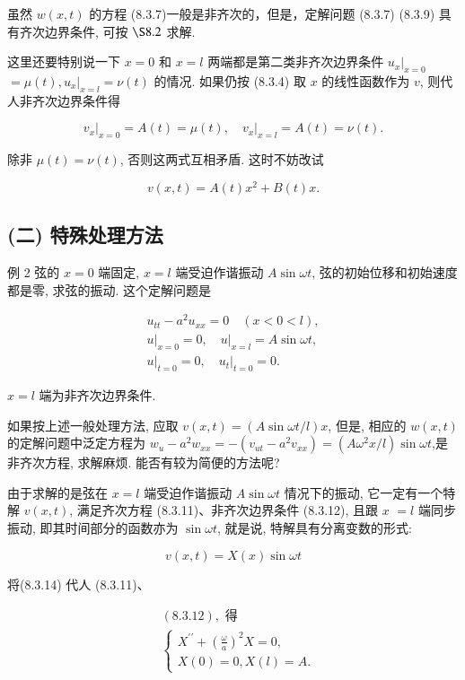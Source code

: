 虽然 $w(x, t)$ 的方程 (8.3.7)一般是非齐次的，但是，定解问题 (8.3.7) (8.3.9) 具有齐次边界条件, 可按 $\S 8.2$ 求解.

这里还要特别说一下 $x=0$ 和 $x=l$ 两端都是第二类非齐次边界条件 $\left.u_{x}\right|_{x=0}$ $=\mu(t),\left.u_{x}\right|_{x=l}=\nu(t)$ 的情况. 如果仍按 (8.3.4) 取 $x$ 的线性函数作为 $v$, 则代人非齐次边界条件得

$$
\left.v_{x}\right|_{x=0}=A(t)=\mu(t),\left.\quad v_{x}\right|_{x=l}=A(t)=\nu(t) .
$$

除非 $\mu(t)=\nu(t)$, 否则这两式互相矛盾. 这时不妨改试

$$
v(x, t)=A(t) x^{2}+B(t) x .
$$

\subsection{(二) 特殊处理方法}
例 2 弦的 $x=0$ 端固定, $x=l$ 端受迫作谐振动 $A \sin \omega t$, 弦的初始位移和初始速度都是零, 求弦的振动. 这个定解问题是

$$
\begin{gathered}
u_{t t}-a^{2} u_{x x}=0 \quad(x<0<l), \\
\left.u\right|_{x=0}=0,\left.\quad u\right|_{x=l}=A \sin \omega t, \\
\left.u\right|_{t=0}=0,\left.\quad u_{t}\right|_{t=0}=0 .
\end{gathered}
$$

$x=l$ 端为非齐次边界条件.

如果按上述一般处理方法, 应取 $v(x, t)=(A \sin \omega t / l) x$, 但是, 相应的 $w(x, t)$ 的定解问题中泛定方程为 $w_{u}-a^{2} w_{x x}=-\left(v_{u t}-a^{2} v_{x x}\right)=\left(A \omega^{2} x / l\right) \sin \omega t$,是非齐次方程, 求解麻烦. 能否有较为简便的方法呢?

由于求解的是弦在 $x=l$ 端受迫作谐振动 $A \sin \omega t$ 情况下的振动, 它一定有一个特解 $v(x, t)$, 满足齐次方程 (8.3.11)、非齐次边界条件 (8.3.12), 且跟 $x$
$=l$ 端同步振动, 即其时间部分的函数亦为 $\sin \omega t$, 就是说, 特解具有分离变数的形式:

$$
v(x, t)=X(x) \sin \omega t
$$

将(8.3.14) 代人 (8.3.11)、

$$
\begin{aligned}
& (8.3 .12), \text { 得 } \\
& \left\{\begin{array}{l}
X^{\prime \prime}+\left(\frac{\omega}{a}\right)^{2} X=0, \\
X(0)=0, X(l)=A .
\end{array}\right.
\end{aligned}
$$

